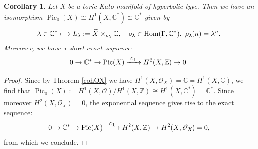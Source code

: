\documentclass[JEP,XML,SOM,Unicode,NoFloatCountersInSection]{cedram}
\let\mathcal\mathscr
\newtheorem{corollary}[theorem]{Corollary}
\theoremstyle{definition}
\let\wt\widetilde
\newcommand\mto{\mathchoice{\longmapsto}{\mapsto}{\mapsto}{\mapsto}}
\newcommand{\To}[1]{\mathchoice{\xrightarrow{\textstyle\kern4pt#1\kern3pt}}{\stackrel{#1}{\longrightarrow}}{}{}}
\let\la\lambda
\newcommand{\CC}{\mathbb{C}}
\newcommand{\ZZ}{\mathbb{Z}}
\newcommand{\Oo}{\mathcal{O}}
\DeclareMathOperator{\Hom}{Hom}
\DeclareMathOperator{\Pic}{Pic}
\begin{document}
\begin{corollary}
Let $X$ be a toric Kato manifold of hyperbolic type. Then we have an isomorphism $\Pic_0(X)\cong H^1(X,\CC^*)\cong \CC^*$ given by
\begin{equation*}
\la\in\CC^*\mto L_\la:=\wt{X}\times_{\rho_\la}\CC, \quad \rho_\la\in\Hom(\Gamma,\CC^*), \ \rho_\la(n)=\la^n.
\end{equation*}
Moreover, we have a short exact sequence:
\begin{equation*}
0\to \CC^*\to \Pic(X)\To{c_1} H^2(X,\ZZ)\to 0.
\end{equation*}
\end{corollary}
\begin{proof}
Since by Theorem \ref{cohOX} we have $H^1(X,\Oo_X)=\CC=H^1(X,\CC)$, we find that $\Pic_0(X):=H^1(X,\Oo)/H^1(X,\ZZ)\cong H^1(X,\CC^*)=\CC^*$. Since moreover $H^2(X,\Oo_X)=0$, the exponential sequence gives rise to the exact sequence:
\begin{equation*}
0\to \CC^*\to  \Pic(X)\To{c_1} H^2(X,\ZZ)\to H^2(X,\Oo_X)=0,
\end{equation*}
from which we conclude.
\end{proof}
\end{document}
